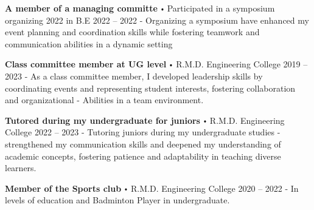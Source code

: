 \documentclass{article}
\renewcommand{\labelitemi}{
        $\vcenter{\hbox{\tiny$\bullet$}}$\hspace*{3pt}
        }
\renewcommand{\labelitemii}{
        $\vcenter{\hbox{\tiny$\bullet$}}$\hspace*{-3pt}
        }
\newenvironment{bullet-list-major}{
          \begin{list}{\labelitemii}{\setlength\leftmargin{3pt} 
          \topsep 0pt \itemsep -2pt}}{\vspace*{4pt}\end{list}
          }
\begin{document}
      {
            \begin{bullet-list-major}
            \item \textbf{A member of a managing committe} \labelitemi Participated in a symposium organizing 2022 in B.E \hfill 2022 -- 2022
            \newline -{ Organizing a symposium have enhanced my event planning and coordination skills while fostering teamwork and communication abilities in a dynamic setting}
            \end{bullet-list-major}
            

            \begin{bullet-list-major}
            \item \textbf{Class committee member at UG level} \labelitemi R.M.D. Engineering College \hfill 2019 -- 2023
            \newline -{ As a class committee member, I developed leadership skills by coordinating events and representing student interests, fostering collaboration and organizational
}\newline -{ Abilities in a team environment.}
            \end{bullet-list-major}
            

            \begin{bullet-list-major}
            \item \textbf{Tutored during my undergraduate for juniors} \labelitemi R.M.D. Engineering College \hfill 2022 -- 2023
            \newline -{ Tutoring juniors during my undergraduate studies
}\newline -{ strengthened my communication skills and deepened my understanding of academic concepts, fostering patience and adaptability in teaching diverse learners.}
            \end{bullet-list-major}
            

            \begin{bullet-list-major}
            \item \textbf{Member of the Sports club} \labelitemi R.M.D. Engineering College \hfill 2020 -- 2022
            \newline -{ In levels of education and Badminton Player in undergraduate.}
            \end{bullet-list-major}
            }
      
\end{document}

